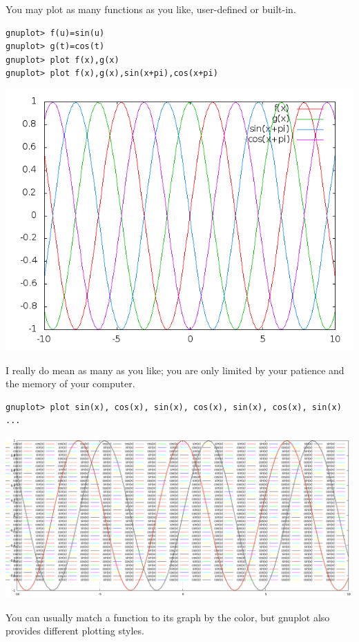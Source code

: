 \documentclass[11pt,letterpaper]{report}
\begin{document}
You may plot as many functions as you like, user-defined or built-in.
\begin{verbatim}
gnuplot> f(u)=sin(u)
gnuplot> g(t)=cos(t)
gnuplot> plot f(x),g(x)
gnuplot> plot f(x),g(x),sin(x+pi),cos(x+pi)
\end{verbatim}
\includegraphics[width=150mm]{multi-plots.png}

I really do mean as many as you like; you are only limited by your patience and the memory of your computer.


\begin{verbatim}
gnuplot> plot sin(x), cos(x), sin(x), cos(x), sin(x), cos(x), sin(x) ...
\end{verbatim}

\includegraphics[width=150mm]{too-many-plots.png}


You can usually match a function to its graph by the color, but gnuplot also provides different plotting styles.
\end{document}

